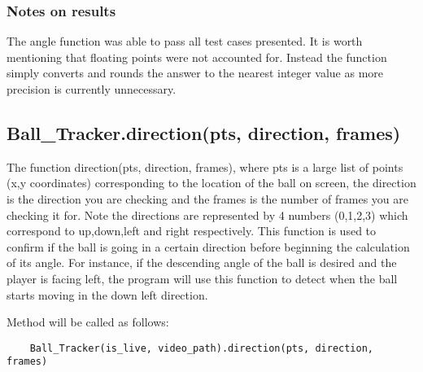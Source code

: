 \subsubsection{Notes on results}
The angle function was able to pass all test cases presented. It is worth mentioning that floating points were not accounted for. Instead the function simply converts and rounds the answer to the nearest integer value as more precision is currently unnecessary. 

\subsection{Ball\_Tracker.direction(pts, direction, frames)} \label{test_direction}
The function direction(pts, direction, frames), where pts is a large list of points (x,y coordinates) corresponding to the location of the ball on screen, the direction is the direction you are checking and the frames is the number of frames you are checking it for. Note the directions are represented by 4 numbers (0,1,2,3) which correspond to up,down,left and right respectively. This function is used to confirm if the ball is going in a certain direction before beginning the calculation of its angle. For instance, if the descending angle of the ball is desired and the player is facing left, the program will use this function to detect when the ball starts moving in the down left direction. 

Method will be called as follows:
\begin{verbatim}
    Ball_Tracker(is_live, video_path).direction(pts, direction, frames)
\end{verbatim}

